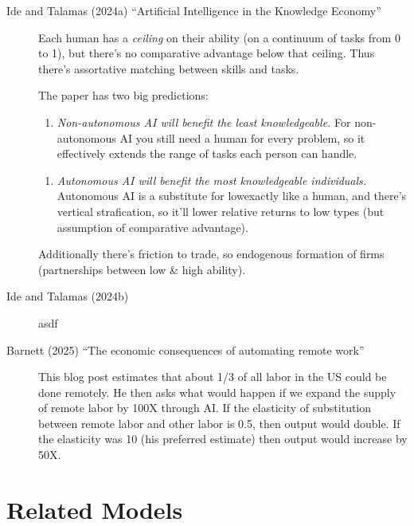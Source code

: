 \documentclass[
  11pt,
  letterpaper,
  DIV=11,
  numbers=noendperiod,
  oneside]{scrartcl}
\providecommand{\tightlist}{%
  \setlength{\itemsep}{0pt}\setlength{\parskip}{0pt}}\usepackage{longtable,booktabs,array}
\begin{document}
\begin{description}
\item[Ide and Talamas (2024a) ``Artificial Intelligence in the Knowledge
Economy'']
Each human has a \emph{ceiling} on their ability (on a continuum of
tasks from 0 to 1), but there's no comparative advantage below that
ceiling. Thus there's assortative matching between skills and tasks.

The paper has two big predictions:

\begin{enumerate}
\def\labelenumi{\arabic{enumi}.}
\tightlist
\item
  \emph{Non-autonomous AI will benefit the least knowledgeable.} For
  non-autonomous AI you still need a human for every problem, so it
  effectively extends the range of tasks each person can handle.
\end{enumerate}

\begin{enumerate}
\def\labelenumi{\arabic{enumi}.}
\setcounter{enumi}{1}
\tightlist
\item
  \emph{Autonomous AI will benefit the most knowledgeable individuals.}
  Autonomous AI is a substitute for lowexactly like a human, and there's
  vertical strafication, so it'll lower relative returns to low types
  (but assumption of comparative advantage).
\end{enumerate}

Additionally there's friction to trade, so endogenous formation of firms
(partnerships between low \& high ability).
\item[Ide and Talamas (2024b)]
asdf
\end{description}

\begin{description}
\item[Barnett (2025) ``The economic consequences of automating remote
work'']
This blog post estimates that about 1/3 of all labor in the US could be
done remotely. He then asks what would happen if we expand the supply of
remote labor by 100X through AI. If the elasticity of substitution
between remote labor and other labor is 0.5, then output would double.
If the elasticity was 10 (his preferred estimate) then output would
increase by 50X.
\end{description}

\section{Related Models}\label{related-models}
\end{document}
